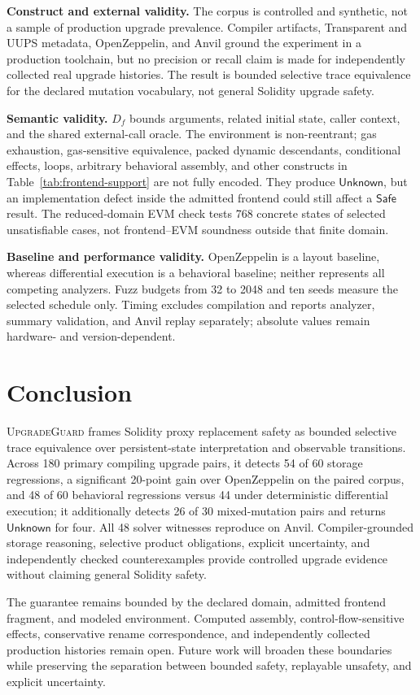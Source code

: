 \documentclass[runningheads]{llncs}
\newcommand{\tool}{\textsc{UpgradeGuard}\xspace}
\newcommand{\Safe}{\mathsf{Safe}}
\newcommand{\Unknown}{\mathsf{Unknown}}
\begin{document}
\textbf{Construct and external validity.} The corpus is controlled and synthetic, not a sample of production upgrade prevalence. Compiler artifacts, Transparent and UUPS metadata, OpenZeppelin, and Anvil ground the experiment in a production toolchain, but no precision or recall claim is made for independently collected real upgrade histories. The result is bounded selective trace equivalence for the declared mutation vocabulary, not general Solidity upgrade safety.

\textbf{Semantic validity.} \(D_f\) bounds arguments, related initial state, caller context, and the shared external-call oracle. The environment is non-reentrant; gas exhaustion, gas-sensitive equivalence, packed dynamic descendants, conditional effects, loops, arbitrary behavioral assembly, and other constructs in Table~\ref{tab:frontend-support} are not fully encoded. They produce \(\Unknown\), but an implementation defect inside the admitted frontend could still affect a \(\Safe\) result. The reduced-domain EVM check tests 768 concrete states of selected unsatisfiable cases, not frontend--EVM soundness outside that finite domain.

\textbf{Baseline and performance validity.} OpenZeppelin is a layout baseline, whereas differential execution is a behavioral baseline; neither represents all competing analyzers. Fuzz budgets from 32 to 2048 and ten seeds measure the selected schedule only. Timing excludes compilation and reports analyzer, summary validation, and Anvil replay separately; absolute values remain hardware- and version-dependent.

\section{Conclusion}
\label{sec:conclusion}

\tool frames Solidity proxy replacement safety as bounded selective trace equivalence over persistent-state interpretation and observable transitions. Across 180 primary compiling upgrade pairs, it detects 54 of 60 storage regressions, a significant 20-point gain over OpenZeppelin on the paired corpus, and 48 of 60 behavioral regressions versus 44 under deterministic differential execution; it additionally detects 26 of 30 mixed-mutation pairs and returns \(\Unknown\) for four. All 48 solver witnesses reproduce on Anvil. Compiler-grounded storage reasoning, selective product obligations, explicit uncertainty, and independently checked counterexamples provide controlled upgrade evidence without claiming general Solidity safety.

The guarantee remains bounded by the declared domain, admitted frontend fragment, and modeled environment. Computed assembly, control-flow-sensitive effects, conservative rename correspondence, and independently collected production histories remain open. Future work will broaden these boundaries while preserving the separation between bounded safety, replayable unsafety, and explicit uncertainty.



\end{document}
